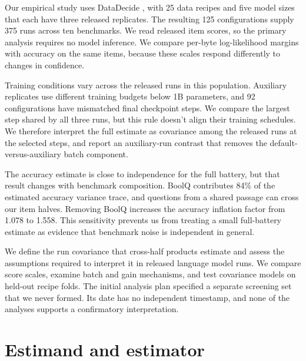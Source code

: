 \documentclass{article}
\begin{document}
Our empirical study uses DataDecide \citep{magnusson2025}, with 25 data recipes and five model sizes that each have three released replicates. The resulting 125 configurations supply 375 runs across ten benchmarks. We read released item scores, so the primary analysis requires no model inference. We compare per-byte log-likelihood margins with accuracy on the same items, because these scales respond differently to changes in confidence.

Training conditions vary across the released runs in this population. Auxiliary replicates use different training budgets below 1B parameters, and 92 configurations have mismatched final checkpoint steps. We compare the largest step shared by all three runs, but this rule doesn't align their training schedules. We therefore interpret the full estimate as covariance among the released runs at the selected steps, and report an auxiliary-run contrast that removes the default-versus-auxiliary batch component.

The accuracy estimate is close to independence for the full battery, but that result changes with benchmark composition. BoolQ contributes 84\% of the estimated accuracy variance trace, and questions from a shared passage can cross our item halves. Removing BoolQ increases the accuracy inflation factor from 1.078 to 1.558. This sensitivity prevents us from treating a small full-battery estimate as evidence that benchmark noise is independent in general.

We define the run covariance that cross-half products estimate and assess the assumptions required to interpret it in released language model runs. We compare score scales, examine batch and gain mechanisms, and test covariance models on held-out recipe folds. The initial analysis plan specified a separate screening set that we never formed. Its date has no independent timestamp, and none of the analyses supports a confirmatory interpretation.

\section{Estimand and estimator}
\label{sec:estimator}
\end{document}
